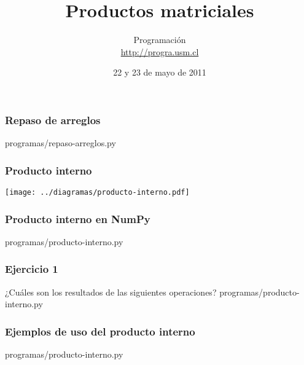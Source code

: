 \documentclass[12pt]{beamer}
\title{Productos matriciales}
\author{
  Programación \\ \url{http://progra.usm.cl}
}
\date{22 y 23 de mayo de 2011}
\begin{document}
  \begin{frame}
    \maketitle
  \end{frame}

  \begin{frame}
    \label{repaso-arreglos}
    \frametitle{Repaso de arreglos}
        {programas/repaso-arreglos.py}
  \end{frame}

  \begin{frame}
    \label{producto-interno}
    \frametitle{Producto interno}
    \texttt{[image: ../diagramas/producto-interno.pdf]}
  \end{frame}

  \begin{frame}
    \label{producto-interno-numpy}
    \frametitle{Producto interno en NumPy}
    
        {programas/producto-interno.py}
  \end{frame}

  \begin{frame}
    \label{producto-interno-numpy}
    \frametitle{Ejercicio 1}
    ¿Cuáles son los resultados
    de las siguientes operaciones?
        {programas/producto-interno.py}
  \end{frame}

  \begin{frame}
    \label{ejemplos-producto-interno}
    \frametitle{Ejemplos de uso del producto interno}
        {programas/producto-interno.py}
  \end{frame}
\end{document}
